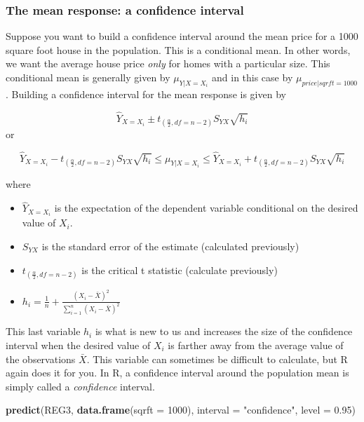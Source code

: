\documentclass[
]{book}
\newenvironment{Shaded}{\begin{snugshade}}{\end{snugshade}}
\newcommand{\AttributeTok}[1]{\textcolor[rgb]{0.13,0.29,0.53}{#1}}
\newcommand{\DecValTok}[1]{\textcolor[rgb]{0.00,0.00,0.81}{#1}}
\newcommand{\FloatTok}[1]{\textcolor[rgb]{0.00,0.00,0.81}{#1}}
\newcommand{\FunctionTok}[1]{\textcolor[rgb]{0.13,0.29,0.53}{\textbf{#1}}}
\newcommand{\NormalTok}[1]{#1}
\newcommand{\StringTok}[1]{\textcolor[rgb]{0.31,0.60,0.02}{#1}}
\begin{document}
\subsubsection*{The mean response: a confidence interval}\label{the-mean-response-a-confidence-interval}

Suppose you want to build a confidence interval around the mean price for a 1000 square foot house in the population. This is a conditional mean. In other words, we want the average house price \emph{only} for homes with a particular size. This conditional mean is generally given by \(\mu_{Y|X=X_i}\) and in this case by \(\mu_{price|sqrft=1000}\). Building a confidence interval for the mean response is given by

\[ \hat{Y}_{X=X_i} \pm t_{(\frac{\alpha}{2},df=n-2)}S_{YX} \sqrt{h_i}\]
or

\[ \hat{Y}_{X=X_i} - t_{(\frac{\alpha}{2},df=n-2)}S_{YX} \sqrt{h_i} \leq \mu_{Y|X=X_i} \leq \hat{Y}_{X=X_i} + t_{(\frac{\alpha}{2},df=n-2)}S_{YX} \sqrt{h_i}\]

where

\begin{itemize}
\item
  \(\hat{Y}_{X=X_i}\) is the expectation of the dependent variable conditional on the desired value of \(X_i\).
\item
  \(S_{YX}\) is the standard error of the estimate (calculated previously)
\item
  \(t_{(\frac{\alpha}{2},df=n-2)}\) is the critical t statistic (calculate previously)
\item
  \(h_i = \frac{1}{n}+\frac{(X_i - \bar{X})^2}{\sum_{i=1}^n(X_i - \bar{X})^2}\)
\end{itemize}

This last variable \(h_i\) is what is new to us and increases the size of the confidence interval when the desired value of \(X_i\) is farther away from the average value of the observations \(\bar{X}\). This variable can sometimes be difficult to calculate, but R again does it for you. In R, a confidence interval around the population mean is simply called a \emph{confidence} interval.

\begin{Shaded}
\begin{Highlighting}[]
\FunctionTok{predict}\NormalTok{(REG3,}
        \FunctionTok{data.frame}\NormalTok{(}\AttributeTok{sqrft =} \DecValTok{1000}\NormalTok{), }
        \AttributeTok{interval =} \StringTok{"confidence"}\NormalTok{,}
        \AttributeTok{level =} \FloatTok{0.95}\NormalTok{)}
\end{Highlighting}
\end{Shaded}
\end{document}
